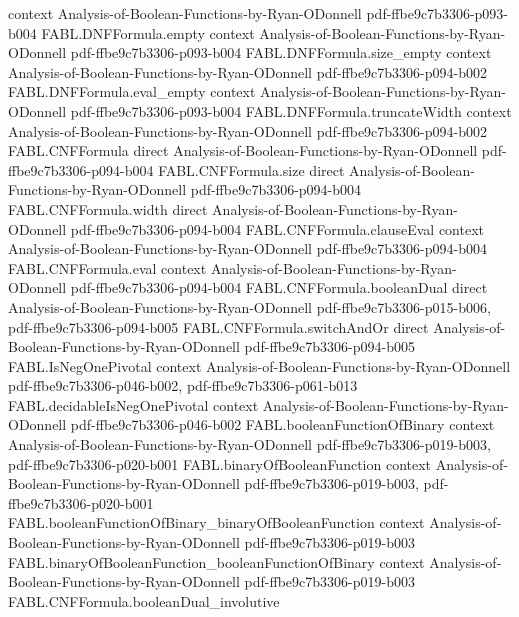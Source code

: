 \begin{theorem}
  {context}
  {Analysis-of-Boolean-Functions-by-Ryan-ODonnell}
  {pdf-ffbe9c7b3306-p093-b004}
\proofstep
  {FABL.DNFFormula.empty}
  {context}
  {Analysis-of-Boolean-Functions-by-Ryan-ODonnell}
  {pdf-ffbe9c7b3306-p093-b004}
\proofstep
  {FABL.DNFFormula.size_empty}
  {context}
  {Analysis-of-Boolean-Functions-by-Ryan-ODonnell}
  {pdf-ffbe9c7b3306-p094-b002}
\proofstep
  {FABL.DNFFormula.eval_empty}
  {context}
  {Analysis-of-Boolean-Functions-by-Ryan-ODonnell}
  {pdf-ffbe9c7b3306-p093-b004}
\proofstep
  {FABL.DNFFormula.truncateWidth}
  {context}
  {Analysis-of-Boolean-Functions-by-Ryan-ODonnell}
  {pdf-ffbe9c7b3306-p094-b002}
\proofstep
  {FABL.CNFFormula}
  {direct}
  {Analysis-of-Boolean-Functions-by-Ryan-ODonnell}
  {pdf-ffbe9c7b3306-p094-b004}
\proofstep
  {FABL.CNFFormula.size}
  {direct}
  {Analysis-of-Boolean-Functions-by-Ryan-ODonnell}
  {pdf-ffbe9c7b3306-p094-b004}
\proofstep
  {FABL.CNFFormula.width}
  {direct}
  {Analysis-of-Boolean-Functions-by-Ryan-ODonnell}
  {pdf-ffbe9c7b3306-p094-b004}
\proofstep
  {FABL.CNFFormula.clauseEval}
  {context}
  {Analysis-of-Boolean-Functions-by-Ryan-ODonnell}
  {pdf-ffbe9c7b3306-p094-b004}
\proofstep
  {FABL.CNFFormula.eval}
  {context}
  {Analysis-of-Boolean-Functions-by-Ryan-ODonnell}
  {pdf-ffbe9c7b3306-p094-b004}
\proofstep
  {FABL.CNFFormula.booleanDual}
  {direct}
  {Analysis-of-Boolean-Functions-by-Ryan-ODonnell}
  {pdf-ffbe9c7b3306-p015-b006,
    pdf-ffbe9c7b3306-p094-b005}
\proofstep
  {FABL.CNFFormula.switchAndOr}
  {direct}
  {Analysis-of-Boolean-Functions-by-Ryan-ODonnell}
  {pdf-ffbe9c7b3306-p094-b005}
\proofstep
  {FABL.IsNegOnePivotal}
  {context}
  {Analysis-of-Boolean-Functions-by-Ryan-ODonnell}
  {pdf-ffbe9c7b3306-p046-b002,
    pdf-ffbe9c7b3306-p061-b013}
\proofstep
  {FABL.decidableIsNegOnePivotal}
  {context}
  {Analysis-of-Boolean-Functions-by-Ryan-ODonnell}
  {pdf-ffbe9c7b3306-p046-b002}
\proofstep
  {FABL.booleanFunctionOfBinary}
  {context}
  {Analysis-of-Boolean-Functions-by-Ryan-ODonnell}
  {pdf-ffbe9c7b3306-p019-b003,
    pdf-ffbe9c7b3306-p020-b001}
\proofstep
  {FABL.binaryOfBooleanFunction}
  {context}
  {Analysis-of-Boolean-Functions-by-Ryan-ODonnell}
  {pdf-ffbe9c7b3306-p019-b003,
    pdf-ffbe9c7b3306-p020-b001}
\proofstep
  {FABL.booleanFunctionOfBinary_binaryOfBooleanFunction}
  {context}
  {Analysis-of-Boolean-Functions-by-Ryan-ODonnell}
  {pdf-ffbe9c7b3306-p019-b003}
\proofstep
  {FABL.binaryOfBooleanFunction_booleanFunctionOfBinary}
  {context}
  {Analysis-of-Boolean-Functions-by-Ryan-ODonnell}
  {pdf-ffbe9c7b3306-p019-b003}
\proofstep
  {FABL.CNFFormula.booleanDual_involutive}

\end{theorem}
